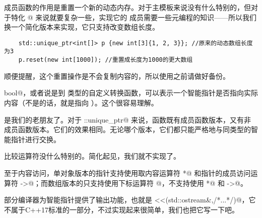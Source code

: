 \lstinline@reset@ 成员函数的作用是重置一个新的动态内存。对于主模板来说没有什么特别的，但对于特化 \lstinline@T[]@ 来说就要复杂一些，实现它的 \lstinline@reset@ 成员需要一些元编程的知识——所以我们换一个简化版本来实现，它只支持改变数组长度。
\begin{lstlisting}
    std::unique_ptr<int[]> p {new int[3]{1, 2, 3}}; //原来的动态数组长度为3
    p.reset(new int[1000]); //重置成长度为1000的更大数组
\end{lstlisting}
顺便提醒，这个重置操作是不会复制内容的，所以使用之前请做好备份。\par
\lstinline@operator bool@，或者说是到 \lstinline@bool@ 类型的自定义转换函数，可以表示一个智能指针是否指向实际内容（不是的话，就是指向 \lstinline@nullptr@）。这个很容易理解。\par
\lstinline@swap@ 是我们的老朋友了。对于 \lstinline@std::unique_ptr@ 来说，\lstinline@swap@ 函数既有成员函数版本，又有非成员函数版本。它们的效果相同。无论哪个版本，它们都只能严格地与同类型的智能指针进行交换。\par
比较运算符没什么特别的。简化起见，我们就不实现了。\par
至于内容访问，单对象版本的指针支持使用取内容运算符 \lstinline@*@ 和指针的成员访问运算符 \lstinline@->@；而数组版本的只支持使用下标运算符 \lstinline@[]@，不支持使用 \lstinline@*@ 和 \lstinline@->@。\par
部分编译器为智能指针提供了输出功能，也就是 \lstinline@operator<<(std::ostream&,/*...*/)@，它不属于C++17标准的一部分，不过实现起来很简单，我们也把它写一下吧。\par
